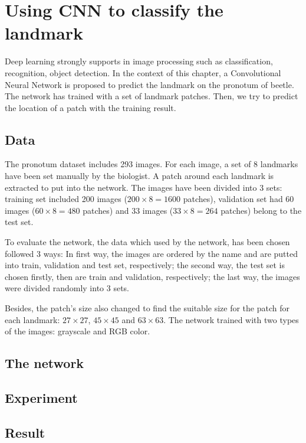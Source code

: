 \chapter{Using CNN to classify the landmark}
Deep learning strongly supports in image processing such as classification, recognition, object detection. In the context of this chapter, a Convolutional Neural Network is proposed to predict the landmark on the pronotum of beetle. The network has trained with a set of landmark patches. Then, we try to predict the location of a patch with the training result. 
\section{Data}
The pronotum dataset includes 293 images. For each image, a set of 8 landmarks have been set manually by the biologist. A patch around each landmark is extracted to put into the network.
The images have been divided into 3 sets: training set included 200 images ($200 \times 8 = 1600 $ patches), validation set had 60 images ($60 \times 8 = 480$ patches) and 33 images ($33 \times 8 = 264$ patches) belong to the test set.

To evaluate the network, the data which used by the network, has been chosen followed 3 ways: In first way, the images are ordered by the name and are putted into train, validation and test set, respectively; the second way, the test set is chosen firstly, then are train and validation, respectively; the last way, the images were divided randomly into 3 sets.

Besides, the patch's size also changed to find the suitable size for the patch for each landmark: $27 \times 27$, $45 \times 45$ and $63 \times 63$. The network trained with two types of the images: grayscale and RGB color.
\section{The network}
\section{Experiment}
\section{Result}